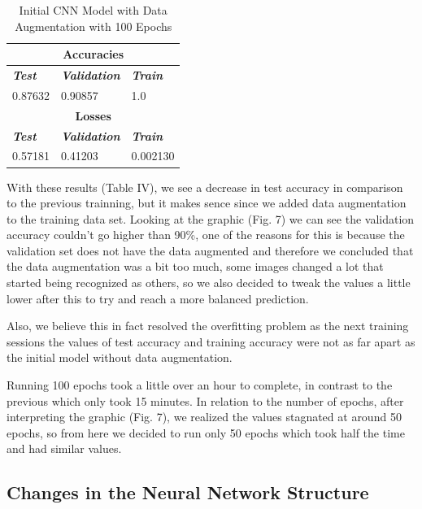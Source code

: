 \documentclass[conference]{IEEEtran}
\begin{document}
\begin{table}[htbp]
\caption{Initial CNN Model with Data Augmentation with 100 Epochs}
\begin{center}
\begin{tabular}{|p{2cm}|p{2cm}|p{2cm}|}
\hline
\multicolumn{3}{|c|}{\textbf{Accuracies}} \\
\hline
\textbf{\textit{Test}}& \textbf{\textit{Validation}}& \textbf{\textit{Train}} \\
\hline
0.87632 & 0.90857 & 1.0 \\
\hline
\multicolumn{3}{|c|}{\textbf{Losses}} \\
\hline
\textbf{\textit{Test}}& \textbf{\textit{Validation}}& \textbf{\textit{Train}} \\
\hline
0.57181 & 0.41203 & 0.002130 \\
\hline
\end{tabular}
\end{center}
\end{table}

With these results (Table IV), we see a decrease in test accuracy in comparison to the previous trainning, but it makes sence since we added data augmentation to the training data set. Looking at the graphic (Fig. 7) we can see the validation accuracy couldn't go higher than 90\%, one of the reasons for this is because the validation set does not have the data augmented and therefore we concluded that the data augmentation was a bit too much, some images changed a lot that started being recognized as others, so we also decided to tweak the values a little lower after this to try and reach a more balanced prediction.

Also, we believe this in fact resolved the overfitting problem as the next training sessions the values of test accuracy and training accuracy were not as far apart as the initial model without data augmentation.

Running 100 epochs took a little over an hour to complete, in contrast to the previous which only took 15 minutes. In relation to the number of epochs, after interpreting the graphic (Fig. 7), we realized the values stagnated at around 50 epochs, so from here we decided to run only 50 epochs which took half the time and had similar values.

\subsection{Changes in the Neural Network Structure}
\end{document}
